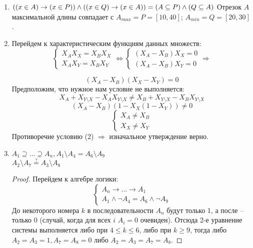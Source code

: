 \documentclass[12pt]{article}
\begin{document}
\begin{enumerate}
        \item \( ((x \in A) \rightarrow (x \in P)) \wedge ((x \in Q) \rightarrow (x \in A)) = (A \subseteq P)
        \wedge (Q \subseteq A) \\ \)
        Отрезок $A$ максимальной длины совпадает с $A_{max} = P = [10, 40]$; $A_{min} = Q = [20, 30]$.

        \item Перейдем к характеристическим функциям данных множеств:
        \begin{equation}
            \left.
            \begin{cases}
                X_AX_X = X_BX_X \\
                X_AX_Y = X_BX_Y
            \end{cases}
            \right. \Leftrightarrow
            \left.
            \begin{cases}
                (X_A - X_B)X_X = 0 \\
                (X_A - X_B)X_Y = 0
            \end{cases}
            \right. \Rightarrow
        \end{equation}

        \begin{equation}
            (X_A - X_B)(X_X - X_Y) = 0
        \end{equation}
        Предположим, что нужное нам условие не выполняется:
        \[ X_A + X_{Y \setminus X} - X_AX_{Y \setminus X} \neq X_B + X_{Y \setminus X} - X_BX_{Y \setminus X} \]
        \[ (X_A - X_B)(1 - X_X(1 - X_Y)) \neq 0\]
        \begin{equation}
            \begin{cases}
                X_A \neq X_B \\
                X_X \neq X_Y
            \end{cases}
        \end{equation}
        Противоречие условию (2) $\Rightarrow$  изначальное утверждение верно.
        \item \( A_1 \supseteq \dots \supseteq A_n, A_1 \setminus A_4 =
        A_6 \setminus A_9 \)\\
        \( A_2 \setminus A_7 \stackrel{?}{=} A_3 \setminus A_8 \)
        \begin{proof}
            Перейдем к алгебре логики:
            \begin{equation}
                \begin{cases}
                    A_n \rightarrow \dots \rightarrow A_1\\
                    A_1 \wedge \lnot A_4 = A_6 \wedge \lnot A_9
                \end{cases}
            \end{equation}
            До некоторого номера $k$ в последовательности $A_n$ будут только 1, а после
            -- только 0 (случай, когда для всех $i$ $A_i = 0$ очевиден).
            Отсюда 2-е уравнение системы выполняется либо при $4 \leq k \leq 6$, либо при
            $k \geq 9$, тогда либо $A_2 = A_3 = 1, A_7 = A_8 = 0$ либо $A_2 =
            A_3 = A_7 = A_8$.
        \end{proof}


\end{enumerate}
\end{document}
